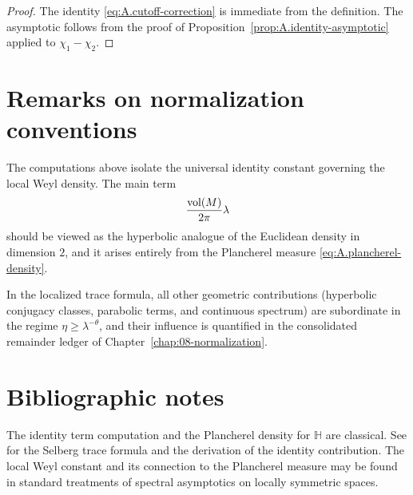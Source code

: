 \begin{proof}
The identity \eqref{eq:A.cutoff-correction} is immediate from the definition.
The asymptotic follows from the proof of Proposition~\ref{prop:A.identity-asymptotic} applied to $\chi_1-\chi_2$.
\end{proof}

\section{Remarks on normalization conventions}
\label{sec:A.remarks}

The computations above isolate the universal identity constant governing the local Weyl density.  The main term
\[
\frac{\mathop{\mathrm{vol}}\nolimits(M)}{2\pi}\lambda
\]
should be viewed as the hyperbolic analogue of the Euclidean density in dimension $2$, and it arises entirely from
the Plancherel measure \eqref{eq:A.plancherel-density}.

In the localized trace formula, all other geometric contributions (hyperbolic conjugacy classes, parabolic terms, and
continuous spectrum) are subordinate in the regime $\eta\ge \lambda^{-\theta}$, and their influence is quantified in
the consolidated remainder ledger of Chapter~\ref{chap:08-normalization}.

\section*{Bibliographic notes}

The identity term computation and the Plancherel density for $\mathbb{H}$ are classical.
See \cite{Hejhal1983,Buser1992,Iwaniec2002} for the Selberg trace formula and the derivation of the identity
contribution.  The local Weyl constant and its connection to the Plancherel measure may be found in standard
treatments of spectral asymptotics on locally symmetric spaces.

